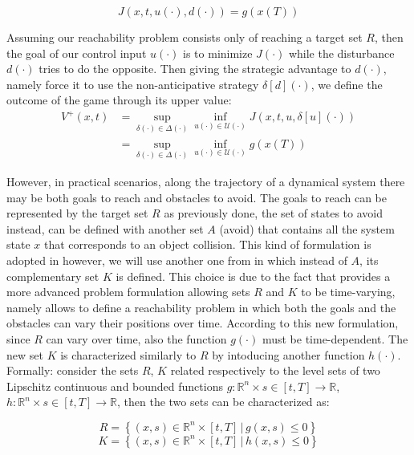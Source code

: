 \begin{equation}
\label{eq:j_level_set}
    J(x, t, u(\cdot), d(\cdot)) = g(x(T))
\end{equation}

Assuming our reachability problem consists only of reaching a target set $R$, then the goal of our control input $u(\cdot)$ is to minimize $J(\cdot)$ while the disturbance $d(\cdot)$ tries to do the opposite. Then giving the strategic advantage to $d(\cdot)$, namely force it to use the non-anticipative strategy $\delta[d](\cdot)$, we define the outcome of the game through its upper value:
\begin{equation}
	\begin{split}
		V^+(x, t) 
		& = \sup_{\delta(\cdot) \in \Delta(\cdot)}\inf_{u(\cdot) \in \mathcal{U}(\cdot)} J(x,t, u, \delta[u](\cdot))    \\
		& = \sup_{\delta(\cdot) \in \Delta(\cdot)}\inf_{u(\cdot) \in \mathcal{U}(\cdot)} g(x(T))
	\end{split}
\end{equation}

However, in practical scenarios, along the trajectory of a dynamical system there may be both goals to reach and obstacles to avoid. The goals to reach can be represented by the target set $R$ as previously done, the set of states to avoid instead, can be defined with another set $A$ (avoid) that contains all the system state $x$ that corresponds to an object collision. This kind of formulation is adopted in \cite{reach_avoid_with_dist} however, we will use another one from \cite{new_paper} in which instead of $A$, its complementary set $K$ is defined. This choice is due to the fact that \cite{new_paper} provides a more advanced problem formulation allowing sets $R$ and $K$ to be time-varying, namely allows to define a reachability problem in which both the goals and the obstacles can vary their positions over time. According to this new formulation, since $R$ can vary over time, also the function $g(\cdot)$ must be time-dependent. The new set $K$ is characterized similarly to $R$ by intoducing another function $h(\cdot)$. Formally: consider the sets $R$, $K$ related respectively to the level sets of two Lipschitz continuous and bounded functions $g: \mathbb{R}^n \times s \in [t, T]\rightarrow \mathbb{R}$, $h: \mathbb{R}^n \times s \in [t, T] \rightarrow \mathbb{R}$, then the two sets can be characterized as:

\begin{equation} 
	\label{R}
	R = \left\{ (x,s) \in \mathbb{R}^n \times [t,T]\,|\, g(x, s) \leq 0 \right\}
\end{equation}
\begin{equation} 
	\label{K}
	K = \left\{(x,s) \in \mathbb{R}^n \times [t,T] \,|\, h(x, s) \leq 0 \right\}
\end{equation}

